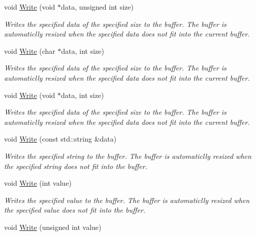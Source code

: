 \begin{DoxyCompactItemize}
void \hyperlink{class_senergy_1_1_byte_buffer_ac4a328ba46fb339b37cb0475c6944c18}{Write} (void $\ast$data, unsigned int size)
\begin{DoxyCompactList}\small\item\em Writes the specified data of the specified size to the buffer. The buffer is automaticlly resized when the specified data does not fit into the current buffer. \end{DoxyCompactList}\item 
void \hyperlink{class_senergy_1_1_byte_buffer_a3dbfe87ee79c1322252c625bf4915f18}{Write} (char $\ast$data, int size)
\begin{DoxyCompactList}\small\item\em Writes the specified data of the specified size to the buffer. The buffer is automaticlly resized when the specified data does not fit into the current buffer. \end{DoxyCompactList}\item 
void \hyperlink{class_senergy_1_1_byte_buffer_adeb00769eae3728d222587e00810d422}{Write} (void $\ast$data, int size)
\begin{DoxyCompactList}\small\item\em Writes the specified data of the specified size to the buffer. The buffer is automaticlly resized when the specified data does not fit into the current buffer. \end{DoxyCompactList}\item 
void \hyperlink{class_senergy_1_1_byte_buffer_a9dc9ad6de5d9401a698984634537b27a}{Write} (const std\-::string \&data)
\begin{DoxyCompactList}\small\item\em Writes the specified string to the buffer. The buffer is automaticlly resized when the specified string does not fit into the buffer. \end{DoxyCompactList}\item 
void \hyperlink{class_senergy_1_1_byte_buffer_ab523222c96a0c1fff96a7f6c2794ca2d}{Write} (int value)
\begin{DoxyCompactList}\small\item\em Writes the specified value to the buffer. The buffer is automaticlly resized when the specified value does not fit into the buffer. \end{DoxyCompactList}\item 
void \hyperlink{class_senergy_1_1_byte_buffer_a8a51e4f9795d312ff2ab8f152b533bb7}{Write} (unsigned int value)
\item 

\end{DoxyCompactItemize}
